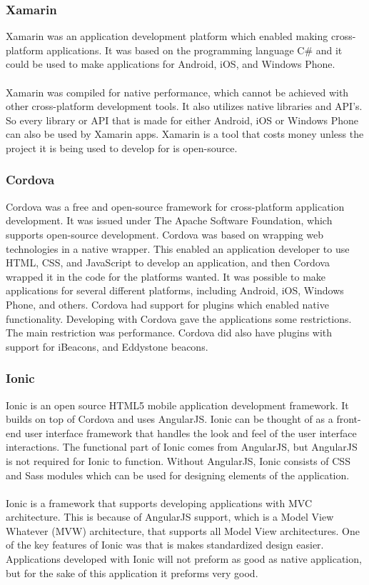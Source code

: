 \subsubsection{Xamarin}
Xamarin was an application development platform which enabled making cross-platform applications. It was based on the programming language C\# and it could be used to make applications for Android, iOS, and Windows Phone\cite{xamarin}.\\
\\
Xamarin was compiled for native performance, which cannot be achieved with other cross-platform development tools. It also utilizes native libraries and API's. So every library or API that is made for either Android, iOS or Windows Phone can also be used by Xamarin apps. Xamarin is a tool that costs money unless the project it is being used to develop for is open-source.

\subsubsection{Cordova}
Cordova was a free and open-source framework for cross-platform application development.\cite{cordova} It was issued under The Apache Software Foundation, which supports open-source development. Cordova was based on wrapping web technologies in a native wrapper. This enabled an application developer to use HTML, CSS, and JavaScript to develop an application, and then Cordova wrapped it in the code for the platforms wanted.\cite{cordova2} It was possible to make applications for several different platforms, including Android, iOS, Windows Phone, and others. Cordova had support for plugins which enabled native functionality. Developing with Cordova gave the applications some restrictions. The main restriction was performance.\cite{cordova3} Cordova did also have plugins with support for iBeacons\cite{ibeacon_plugin}, and Eddystone\cite{eddystone_plugin} beacons.

\subsubsection{Ionic}
Ionic is an open source HTML5 mobile application development framework. It builds on top of Cordova and uses AngularJS. Ionic can be thought of as a front-end user interface framework that handles the look and feel of the user interface interactions. The functional part of Ionic comes from AngularJS, but AngularJS is not required for Ionic to function. Without AngularJS, Ionic consists of CSS and Sass modules which can be used for designing elements of the application.\cite{ionic}\\
\\
Ionic is a framework that supports developing applications with MVC architecture. This is because of AngularJS support, which is a Model View Whatever (MVW) architecture, that supports all Model View architectures. One of the key features of Ionic was that is makes standardized design easier. Applications developed with Ionic will not preform as good as native application, but for the sake of this application it preforms very good. 
\cite{ionic2}\cite{ionic3}

